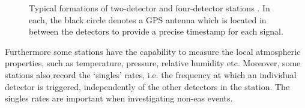 \begin{figure}[htbp!]
	\centering
	\qquad
	\qquad
	\caption{Typical formations of two-detector and four-detector stations \citep{fokkema_hisparc_2012, van_dam_hisparc_2020}. In each, the black circle denotes a GPS antenna which is located in between the detectors to provide a precise timestamp for each signal.}
	\label{fig:HS_station_layouts}
\end{figure}


Furthermore some stations have the capability to measure the local atmospheric properties, such as temperature, pressure, relative humidity etc. Moreover, some stations also record the `singles' rates, i.e. the frequency at which an individual detector is triggered, independently of the other detectors in the station. The singles rates are important when investigating non-\gls{eas} events.

